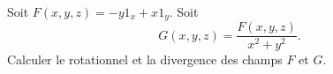 
\begin{exercice}\label{exoOutilsMath-0065}

    Soit $F(x,y,z)=-y1_x+x 1_y$. Soit
    \begin{equation}
        G(x,y,z)=\frac{ F(x,y,z) }{ x^2+y^2 }.
    \end{equation}
    Calculer le rotationnel et la divergence des champs $F$ et $G$.

\end{exercice}
